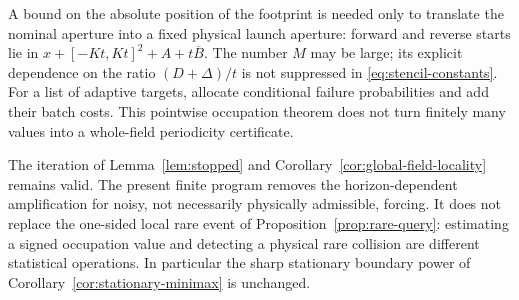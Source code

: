 \begin{remark}
\label{rem:stencil-scope}
A bound on the absolute position of the footprint is needed only to
translate the nominal aperture into a fixed physical launch aperture:
forward and reverse starts lie in
$x+[-Kt,Kt]^2+A+t\overline B$. The number $M$ may be large; its
explicit dependence on the ratio $(D+\Delta)/t$ is not suppressed in
\eqref{eq:stencil-constants}. For a list of adaptive targets, allocate
conditional failure probabilities and add their batch costs. This
pointwise occupation theorem does not turn finitely many values into
a whole-field periodicity certificate.

The iteration of Lemma~\ref{lem:stopped} and
Corollary~\ref{cor:global-field-locality} remains valid. The present
finite program removes the horizon-dependent amplification for noisy,
not necessarily physically admissible, forcing. It does not replace
the one-sided local rare event of Proposition~\ref{prop:rare-query}:
estimating a signed occupation value and detecting a physical rare
collision are different statistical operations. In particular the
sharp stationary boundary power of
Corollary~\ref{cor:stationary-minimax} is unchanged.
\end{remark}
